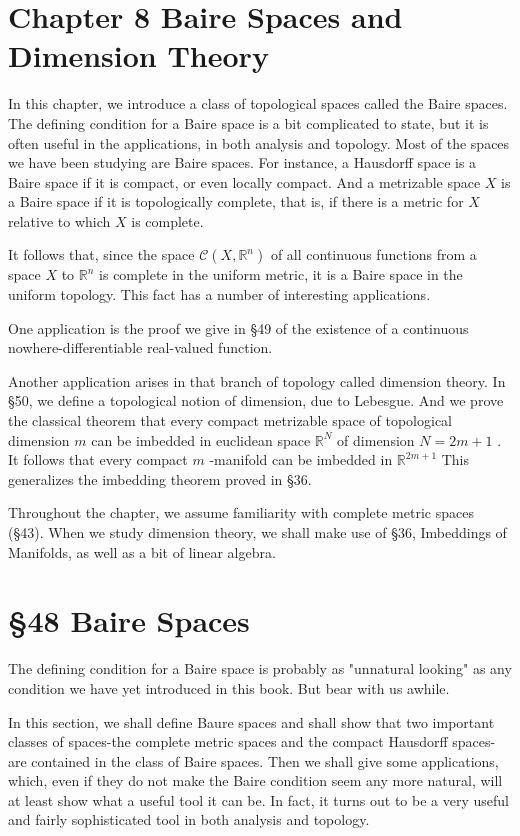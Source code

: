 \documentclass[10pt]{article}
\begin{document}
\section*{Chapter 8 Baire Spaces and Dimension Theory}

In this chapter, we introduce a class of topological spaces called the Baire spaces. The defining condition for a Baire space is a bit complicated to state, but it is often useful in the applications, in both analysis and topology. Most of the spaces we have been studying are Baire spaces. For instance, a Hausdorff space is a Baire space if it is compact, or even locally compact. And a metrizable space \(X\) is a Baire space if it is topologically complete, that is, if there is a metric for \(X\) relative to which \(X\) is complete.

It follows that, since the space \(\mathcal{C}\left( {X,{\mathbb{R}}^{n}}\right)\) of all continuous functions from a space \(X\) to \({\mathbb{R}}^{n}\) is complete in the uniform metric, it is a Baire space in the uniform topology. This fact has a number of interesting applications.

One application is the proof we give in §49 of the existence of a continuous nowhere-differentiable real-valued function.

Another application arises in that branch of topology called dimension theory. In §50, we define a topological notion of dimension, due to Lebesgue. And we prove the classical theorem that every compact metrizable space of topological dimension \(m\) can be imbedded in euclidean space \({\mathbb{R}}^{N}\) of dimension \(N = {2m} + 1\) . It follows that every compact \(m\) -manifold can be imbedded in \({\mathbb{R}}^{{2m} + 1}\) This generalizes the imbedding theorem proved in §36.

Throughout the chapter, we assume familiarity with complete metric spaces (§43). When we study dimension theory, we shall make use of §36, Imbeddings of Manifolds, as well as a bit of linear algebra.

\section*{§48 Baire Spaces}

The defining condition for a Baire space is probably as "unnatural looking" as any condition we have yet introduced in this book. But bear with us awhile.

In this section, we shall define Baure spaces and shall show that two important classes of spaces-the complete metric spaces and the compact Hausdorff spaces-are contained in the class of Baire spaces. Then we shall give some applications, which, even if they do not make the Baire condition seem any more natural, will at least show what a useful tool it can be. In fact, it turns out to be a very useful and fairly sophisticated tool in both analysis and topology.
\end{document}
